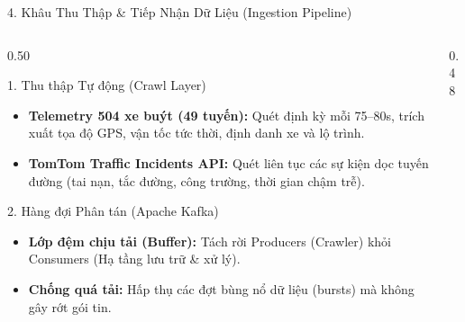 \documentclass[aspectratio=169,10pt]{beamer}
\begin{document}
\begin{frame}{4. Khâu Thu Thập \& Tiếp Nhận Dữ Liệu (Ingestion Pipeline)}
\begin{columns}[T]
    \begin{column}{0.50\textwidth}
        \begin{block}{1. Thu thập Tự động (Crawl Layer)}
            \begin{itemize}\setlength{\itemsep}{2pt}\footnotesize
                \item \textbf{Telemetry 504 xe buýt (49 tuyến):} Quét định kỳ mỗi 75--80s, trích xuất tọa độ GPS, vận tốc tức thời, định danh xe và lộ trình.
                \item \textbf{TomTom Traffic Incidents API:} Quét liên tục các sự kiện dọc tuyến đường (tai nạn, tắc đường, công trường, thời gian chậm trễ).
            \end{itemize}
        \end{block}
        \vspace{2pt}
        \begin{block}{2. Hàng đợi Phân tán (Apache Kafka)}
            \begin{itemize}\setlength{\itemsep}{2pt}\footnotesize
                \item \textbf{Lớp đệm chịu tải (Buffer):} Tách rời Producers (Crawler) khỏi Consumers (Hạ tầng lưu trữ \& xử lý).
                \item \textbf{Chống quá tải:} Hấp thụ các đợt bùng nổ dữ liệu (bursts) mà không gây rớt gói tin.
            \end{itemize}
        \end{block}
    \end{column}

    \begin{column}{0.48\textwidth}
        \centering
\end{column}
\end{columns}
\end{frame}
\end{document}
